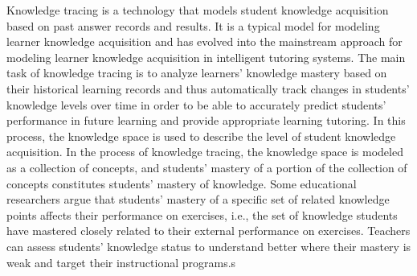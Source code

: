 Knowledge tracing is a technology that models student knowledge acquisition based on past answer records and results. It is a typical model for modeling learner knowledge acquisition and has evolved into the mainstream approach for modeling learner knowledge acquisition in intelligent tutoring systems. The main task of knowledge tracing is to analyze learners' knowledge mastery based on their historical learning records and thus automatically track changes in students' knowledge levels over time in order to be able to accurately predict students' performance in future learning and provide appropriate learning tutoring. In this process, the knowledge space is used to describe the level of student knowledge acquisition. In the process of knowledge tracing, the knowledge space is modeled as a collection of concepts, and students' mastery of a portion of the collection of concepts constitutes students' mastery of knowledge. Some educational researchers argue that students' mastery of a specific set of related knowledge points affects their performance on exercises, i.e., the set of knowledge students have mastered closely related to their external performance on exercises. Teachers can assess students' knowledge status to understand better where their mastery is weak and target their instructional programs.s

